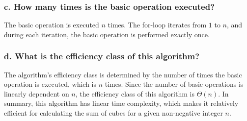 \documentclass{article}
\begin{document}
\subsubsection*{c. How many times is the basic operation executed?}

The basic operation is executed \(n\) times. The for-loop iterates from \(1\) to \(n\), and during each iteration, the basic operation is performed exactly once.

\subsubsection*{d. What is the efficiency class of this algorithm?}

The algorithm's efficiency class is determined by the number of times the basic operation is executed, which is \(n\) times. Since the number of basic operations is linearly dependent on \(n\), the efficiency class of this algorithm is \( \Theta(n) \).
\newline \newline
In summary, this algorithm has linear time complexity, which makes it relatively efficient for calculating the sum of cubes for a given non-negative integer \( n \).
\end{document}
